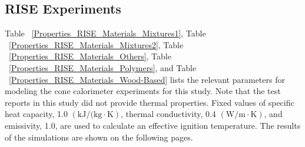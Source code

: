 \clearpage


\subsection{RISE Experiments}\label{sec_RISE_Materials}

Table ~\ref{Properties_RISE_Materials_Mixtures1}, Table ~\ref{Properties_RISE_Materials_Mixtures2}, Table ~\ref{Properties_RISE_Materials_Others}, Table ~\ref{Properties_RISE_Materials_Polymers}, and Table ~\ref{Properties_RISE_Materials_Wood-Based} lists the relevant parameters for modeling the cone calorimeter experiments for this study.
Note that the test reports in this study did not provide thermal properties.
Fixed values of specific heat capacity, 1.0 $\mathrm{\left(kJ/(kg\cdot K\right)}$, thermal conductivity, 0.4 $\mathrm{\left(W/m\cdot K\right)}$, and emissivity, 1.0, are used to calculate an effective ignition temperature.
The results of the simulations are shown on the following pages.

